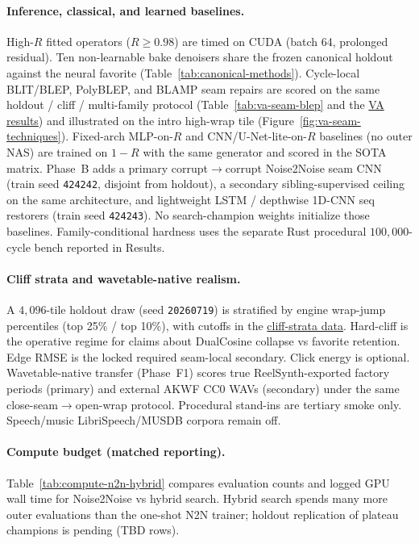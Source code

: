 \paragraph{Inference, classical, and learned baselines.}
High-$R$ fitted operators ($R\ge 0.98$) are timed on CUDA (batch 64, prolonged residual).
Ten non-learnable bake denoisers share the frozen canonical holdout against the neural favorite (Table~\ref{tab:canonical-methods}).
Cycle-local BLIT/BLEP, PolyBLEP, and BLAMP seam repairs are scored on the same holdout / cliff / multi-family protocol (Table~\ref{tab:va-seam-blep} and the \href{https://github.com/reeldemo/denoise-opt-meta/blob/master/paper/Unsupervised_Wrap-Discontinuity_Repair_in_Wavetable_Synthesis_via_Hybrid_GA-PPO_Meta-Search_v12/figures/va_seam_blep.json}{VA results}) and illustrated on the intro high-wrap tile (Figure~\ref{fig:va-seam-techniques}).
Fixed-arch MLP-on-$R$ and CNN/U-Net-lite-on-$R$ baselines (no outer NAS) are trained on $1{-}R$ with the same generator and scored in the SOTA matrix.
Phase~B adds a primary corrupt$\to$corrupt Noise2Noise seam CNN (train seed \texttt{424242}, disjoint from holdout), a secondary sibling-supervised ceiling on the same architecture, and lightweight LSTM / depthwise 1D-CNN seq restorers (train seed \texttt{424243}).
No search-champion weights initialize those baselines.
Family-conditional hardness uses the separate Rust procedural $100{,}000$-cycle bench reported in Results.

\paragraph{Cliff strata and wavetable-native realism.}
A $4{,}096$-tile holdout draw (seed \texttt{20260719}) is stratified by engine wrap-jump percentiles (top 25\% / top 10\%), with cutoffs in the \href{https://github.com/reeldemo/denoise-opt-meta/blob/master/paper/Unsupervised_Wrap-Discontinuity_Repair_in_Wavetable_Synthesis_via_Hybrid_GA-PPO_Meta-Search_v12/figures/cliff_strata.json}{cliff-strata data}.
Hard-cliff is the operative regime for claims about DualCosine collapse vs favorite retention.
Edge RMSE is the locked required seam-local secondary. Click energy is optional.
Wavetable-native transfer (Phase~F1) scores true ReelSynth-exported factory periods (primary) and external AKWF CC0 WAVs (secondary) under the same close-seam$\to$open-wrap protocol.
Procedural stand-ins are tertiary smoke only.
Speech/music LibriSpeech/MUSDB corpora remain off.


\paragraph{Compute budget (matched reporting).}
Table~\ref{tab:compute-n2n-hybrid} compares evaluation counts and logged GPU wall time for Noise2Noise vs hybrid search.
Hybrid search spends many more outer evaluations than the one-shot N2N trainer; holdout replication of plateau champions is pending (TBD rows).


